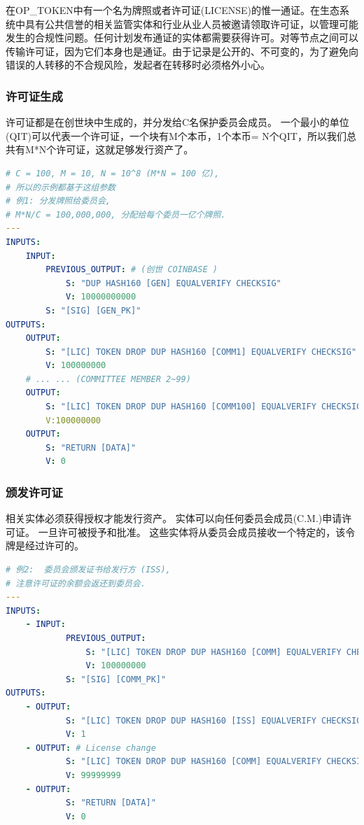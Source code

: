 \documentclass[a4paper,11pt]{article}
\begin{document}
在OP\_TOKEN中有一个名为牌照或者许可证(LICENSE)的惟一通证。在生态系统中具有公共信誉的相关监管实体和行业从业人员被邀请领取许可证，以管理可能发生的合规性问题。任何计划发布通证的实体都需要获得许可。对等节点之间可以传输许可证，因为它们本身也是通证。由于记录是公开的、不可变的，为了避免向错误的人转移的不合规风险，发起者在转移时必须格外小心。
 

\subsubsection{许可证生成}


许可证都是在创世块中生成的，并分发给C名保护委员会成员。
一个最小的单位(QIT)可以代表一个许可证，一个块有M个本币，1个本币= N个QIT，所以我们总共有M*N个许可证，这就足够发行资产了。


\begin{lstlisting}[language=yaml, numbers=none,basicstyle=\footnotesize]
# C = 100, M = 10, N = 10^8 (M*N = 100 亿),
# 所以的示例都基于这组参数 
# 例1: 分发牌照给委员会,
# M*N/C = 100,000,000, 分配给每个委员一亿个牌照.
---
INPUTS:
	INPUT:
		PREVIOUS_OUTPUT: # (创世 COINBASE )
			S: "DUP HASH160 [GEN] EQUALVERIFY CHECKSIG"
			V: 10000000000
		S: "[SIG] [GEN_PK]"
OUTPUTS:
	OUTPUT:
		S: "[LIC] TOKEN DROP DUP HASH160 [COMM1] EQUALVERIFY CHECKSIG"
		V: 100000000
	# ... ... (COMMITTEE MEMBER 2~99)
	OUTPUT:
		S: "[LIC] TOKEN DROP DUP HASH160 [COMM100] EQUALVERIFY CHECKSIG"
		V:100000000
	OUTPUT:
		S: "RETURN [DATA]"
		V: 0
\end{lstlisting}



\subsubsection{颁发许可证}


相关实体必须获得授权才能发行资产。
实体可以向任何委员会成员(C.M.)申请许可证。
一旦许可被授予和批准。
这些实体将从委员会成员接收一个特定的，该令牌是经过许可的。

\lstset{basicstyle=\tiny,style=myListStyle}
\begin{lstlisting}[language=yaml, numbers=none,basicstyle=\footnotesize]
# 例2:  委员会颁发证书给发行方 (ISS),
# 注意许可证的余额会返还到委员会.
---
INPUTS:
	- INPUT:
			PREVIOUS_OUTPUT:
				S: "[LIC] TOKEN DROP DUP HASH160 [COMM] EQUALVERIFY CHECKSIG"
				V: 100000000
			S: "[SIG] [COMM_PK]"
OUTPUTS:
	- OUTPUT:
			S: "[LIC] TOKEN DROP DUP HASH160 [ISS] EQUALVERIFY CHECKSIG"
			V: 1
	- OUTPUT: # License change
			S: "[LIC] TOKEN DROP DUP HASH160 [COMM] EQUALVERIFY CHECKSIG"
			V: 99999999
	- OUTPUT:
			S: "RETURN [DATA]"
			V: 0
\end{lstlisting}
\end{document}
